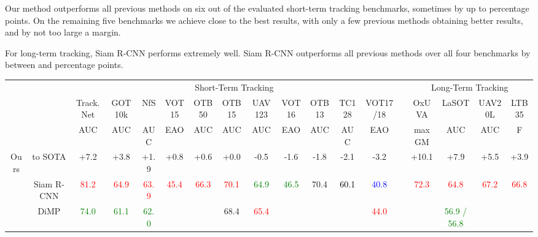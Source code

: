 \documentclass[10pt,twocolumn,letterpaper]{article}
\begin{document}
Our method outperforms all previous methods on six out of the  evaluated short-term tracking benchmarks, sometimes by up to  percentage points. On the remaining five benchmarks we achieve close to the best results, with only a few previous methods obtaining better results, and by not too large a margin. 

For long-term tracking, Siam R-CNN performs extremely well. Siam R-CNN outperforms all previous methods over all four benchmarks by between  and  percentage points.

\begin{table*}[t]
\centering{}\setlength{\tabcolsep}{1.5pt}
\renewcommand{\arraystretch}{0.4}
\scriptsize

\begin{tabular}{cccccccccccccccccc}
\cmidrule{3-13} \cmidrule{4-13} \cmidrule{5-13} \cmidrule{6-13} \cmidrule{7-13} \cmidrule{8-13} \cmidrule{9-13} \cmidrule{10-13} \cmidrule{11-13} \cmidrule{12-13} \cmidrule{13-13} \cmidrule{15-18} \cmidrule{16-18} \cmidrule{17-18} \cmidrule{18-18} 
 &  & \multicolumn{11}{c}{Short-Term Tracking} &  & \multicolumn{4}{c}{Long-Term Tracking}\tabularnewline
\cmidrule{3-13} \cmidrule{4-13} \cmidrule{5-13} \cmidrule{6-13} \cmidrule{7-13} \cmidrule{8-13} \cmidrule{9-13} \cmidrule{10-13} \cmidrule{11-13} \cmidrule{12-13} \cmidrule{13-13} \cmidrule{15-18} \cmidrule{16-18} \cmidrule{17-18} \cmidrule{18-18} 
 &  & Track.Net & GOT10k & NfS & VOT15 & OTB50 & OTB15 & UAV123 & VOT16 & OTB13 & TC128 & VOT17/18 &  & OxUVA & LaSOT & UAV20L & LTB35\tabularnewline
 &  & AUC & AUC & AUC & EAO & AUC & AUC & AUC & EAO & AUC & AUC & EAO &  & maxGM & AUC & AUC & F\tabularnewline
\cmidrule{1-13} \cmidrule{2-13} \cmidrule{3-13} \cmidrule{4-13} \cmidrule{5-13} \cmidrule{6-13} \cmidrule{7-13} \cmidrule{8-13} \cmidrule{9-13} \cmidrule{10-13} \cmidrule{11-13} \cmidrule{12-13} \cmidrule{13-13} \cmidrule{15-18} \cmidrule{16-18} \cmidrule{17-18} \cmidrule{18-18} 
\multirow{2}{*}{Ours} &  to SOTA & +7.2 & +3.8 & +1.9 & +0.8 & +0.6 & +0.0 & -0.5 & -1.6 & -1.8 & -2.1 & -3.2 &  & +10.1 & +7.9 & +5.5 & +3.9\tabularnewline
 & Siam R-CNN & \textcolor{red}{81.2} & \textcolor{red}{64.9} & \textcolor{red}{63.9} & \textcolor{red}{45.4} & \textcolor{red}{66.3} & \textcolor{red}{70.1} & \textcolor{green}{64.9} & \textcolor{green}{46.5} & 70.4 & \textcolor{black}{60.1} & \textcolor{blue}{40.8} &  & \textcolor{red}{72.3} & \textcolor{red}{64.8} & \textcolor{red}{67.2} & \textcolor{red}{66.8}\tabularnewline
\midrule
 & DiMP \cite{Bhat19ICCV} & \textcolor{green}{74.0} & \textcolor{green}{61.1} & \textcolor{green}{62.0} &  &  & 68.4 & \textcolor{red}{65.4} &  &  &  & \textcolor{red}{44.0} &  &  & \textcolor{green}{56.9 / 56.8} &  & \tabularnewline

\end{tabular}
\end{table*}
\end{document}
